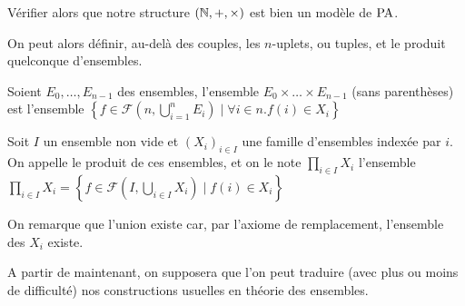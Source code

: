 \begin{exo}
    Vérifier alors que notre structure $(\mathbb{N},+,\times)$ est bien un modèle de $\mathrm{PA}$.
\end{exo}

On peut alors définir, au-delà des couples, les $n$-uplets, ou tuples, et le produit quelconque d'ensembles.

\begin{defi}[Tuple]
    Soient $E_0,\ldots,E_{n-1}$ des ensembles, l'ensemble $E_0\times \ldots \times E_{n-1}$ (sans parenthèses) est l'ensemble $\displaystyle{\left\{ f\in \mathcal F(n,\bigcup_{i=1}^n E_i)\;\Bigg|\; \forall i\in n. f(i)\in X_i\right\}}$
\end{defi}

\begin{defi}
    Soit $I$ un ensemble non vide et $(X_i)_{i\in I}$ une famille d'ensembles indexée par $i$. On appelle le produit de ces ensembles, et on le note $\displaystyle{\prod_{i\in I} X_i}$ l'ensemble $\displaystyle{\prod_{i\in I}X_i = \left\{ f\in\mathcal F(I,\bigcup_{i\in I} X_i) \;\Bigg|\; f(i)\in X_i\right\}}$

    On remarque que l'union existe car, par l'axiome de remplacement, l'ensemble des $X_i$ existe.
\end{defi}

A partir de maintenant, on supposera que l'on peut traduire (avec plus ou moins de difficulté) nos constructions usuelles en théorie des ensembles.